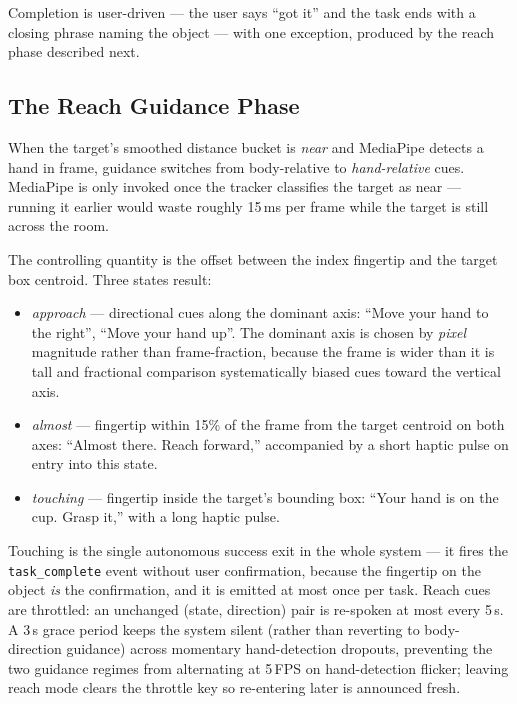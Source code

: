 Completion is user-driven --- the user says ``got it'' and the task ends with a
closing phrase naming the object --- with one exception, produced by the reach
phase described next.

\subsection{The Reach Guidance Phase}
\label{sec:reach_guidance}

When the target's smoothed distance bucket is \emph{near} and MediaPipe detects a
hand in frame, guidance switches from body-relative to \emph{hand-relative} cues.
MediaPipe is only invoked once the tracker classifies the target as near ---
running it earlier would waste roughly 15\,ms per frame while the target is still
across the room.

The controlling quantity is the offset between the index fingertip and the target
box centroid. Three states result:

\begin{itemize}[nosep]
  \item \emph{approach} --- directional cues along the dominant axis: ``Move your
        hand to the right'', ``Move your hand up''. The dominant axis is chosen by
        \emph{pixel} magnitude rather than frame-fraction, because the frame is
        wider than it is tall and fractional comparison systematically biased cues
        toward the vertical axis.
  \item \emph{almost} --- fingertip within 15\% of the frame from the target
        centroid on both axes: ``Almost there. Reach forward,'' accompanied by a
        short haptic pulse on entry into this state.
  \item \emph{touching} --- fingertip inside the target's bounding box: ``Your hand
        is on the cup. Grasp it,'' with a long haptic pulse.
\end{itemize}

Touching is the single autonomous success exit in the whole system --- it fires
the \texttt{task\_complete} event without user confirmation, because the fingertip on the
object \emph{is} the confirmation, and it is emitted at most once per task. Reach
cues are throttled: an unchanged (state, direction) pair is re-spoken at most every
5\,s. A 3\,s grace period keeps the system silent (rather than reverting to
body-direction guidance) across momentary hand-detection dropouts, preventing the
two guidance regimes from alternating at 5\,FPS on hand-detection flicker; leaving
reach mode clears the throttle key so re-entering later is announced fresh.

